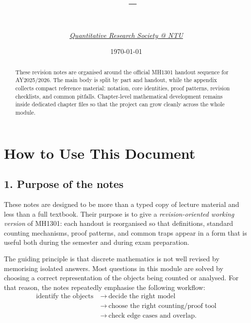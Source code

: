 \documentclass[12pt]{article}
\title{%
    \vspace{-0.5cm}
    {\Large\bfseries \CourseCode\ \CourseName{} -- \DocType}
}
\author{\AcademicYear \\[0.3em]
\textit{\href{https://qrsntu.org}{\color{black}Quantitative Research Society @ NTU}}}
\date{\today}
\begin{document}
\maketitle
\thispagestyle{plainfirst}

\begin{abstract}
\noindent
These revision notes are organised around the official MH1301 handout sequence for AY2025/2026. The main body is split by part and handout, while the appendix collects compact reference material: notation, core identities, proof patterns, revision checklists, and common pitfalls. Chapter-level mathematical development remains inside dedicated chapter files so that the project can grow cleanly across the whole module.
\end{abstract}

\vspace{0.5cm}

\newpage
\tableofcontents
\newpage

\fontsize{10.5pt}{11.9pt}\selectfont
\pagestyle{main}

\section*{How to Use This Document}

\subsection*{1. Purpose of the notes}

These notes are designed to be more than a typed copy of lecture material and less than a full textbook. Their purpose is to give a \emph{revision-oriented working version} of MH1301: each handout is reorganised so that definitions, standard counting mechanisms, proof patterns, and common traps appear in a form that is useful both during the semester and during exam preparation.

The guiding principle is that discrete mathematics is not well revised by memorising isolated answers. Most questions in this module are solved by choosing a correct representation of the objects being counted or analysed. For that reason, the notes repeatedly emphasise the following workflow:
\[
\begin{aligned}
\text{identify the objects}
&\ \longrightarrow\ \text{decide the right model}\\
&\ \longrightarrow\ \text{choose the right counting/proof tool}\\
&\ \longrightarrow\ \text{check edge cases and overlap.}
\end{aligned}
\]
\end{document}
